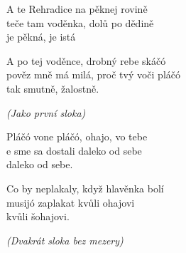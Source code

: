 \ve
{}A te Rehradice na pěknej rovině\\
teče tam voděnka, dolů po dědině\\
je pěkná, je istá

\ve
{}A po tej voděnce, drobný rebe skáčó\\
pověz mně má milá, proč tvý voči pláčó\\
tak smutně, žalostně.

 \textit {(Jako první sloka)}

\ve
{}Pláčó vone pláčó, ohajo, vo tebe\\
e sme sa dostali daleko od sebe\\
daleko od sebe.

\ve

Co by neplakaly, když hlavěnka bolí\\
musijó zaplakat kvůli ohajovi\\
kvůli šohajovi.

\re{} \textit {(Dvakrát sloka bez mezery)}

\esong



